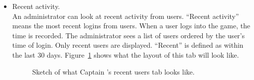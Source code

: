 \begin{itemize}
	\item Recent activity.\\
	An administrator can look at recent activity from users. ``Recent activity'' means the most recent logins from users. When a user logs into the game, the time is recorded. The administrator sees a list of users ordered by the user's time of login. Only recent users are displayed. ``Recent'' is defined as within the last 30 days. Figure~\ref{fig:captain_vtank_recent_users} shows what the layout of this tab will look like.
	\begin{figure}
		\centering
		\caption{Sketch of what Captain \VTank's recent users tab looks like.}
		\label{fig:captain_vtank_recent_users}
	\end{figure}
	

\end{itemize}
